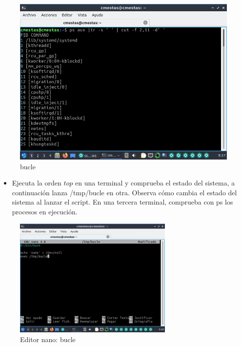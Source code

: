 \documentclass[12pt]{article}
\begin{document}
\begin{figure}[h]
    \centering
    \includegraphics[width=1\textwidth]{images/screenA07.jpg}
    \caption{bucle}
\end{figure}

\begin{itemize}
    \item Ejecuta la orden $top$ en una terminal y comprueba el estado del sistema, a continuación lanza /tmp/bucle en otra. Observa cómo cambia el estado del sistema al lanzar el script. En una tercera terminal, comprueba con ps los procesos en ejecución.
\end{itemize}


\begin{figure}[h]
    \centering
    \includegraphics[width=0.7\textwidth]{images/screenA08.jpg}
    \caption{Editor nano: bucle}
\end{figure}
\end{document}
